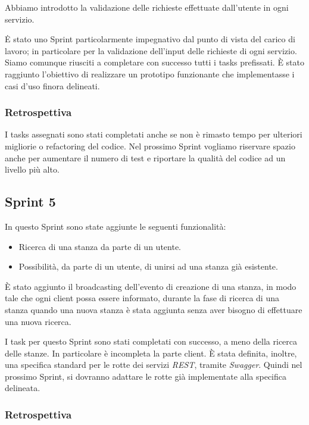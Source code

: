 Abbiamo introdotto la validazione delle richieste effettuate dall'utente in ogni servizio.

Ė stato uno Sprint particolarmente impegnativo dal punto di vista del carico di lavoro; in particolare per la validazione dell'input delle richieste di ogni servizio. Siamo comunque riusciti a completare con successo tutti i tasks prefissati.
È stato raggiunto l'obiettivo di realizzare un prototipo funzionante che implementasse i casi d'uso finora delineati.

\subsubsection{Retrospettiva}

I tasks assegnati sono stati completati anche se non è rimasto tempo per ulteriori migliorie o refactoring del codice. Nel prossimo Sprint vogliamo riservare spazio anche per aumentare il numero di test e riportare la qualità del codice ad un livello più alto.

\subsection{Sprint 5}

In questo Sprint sono state aggiunte le seguenti funzionalità:

\begin{itemize}
%
    \item Ricerca di una stanza da parte di un utente.
%
    \item Possibilità, da parte di un utente, di unirsi ad una stanza già esistente.
%
\end{itemize}

\`E stato aggiunto il broadcasting dell'evento di creazione di una stanza, in modo tale che ogni client possa essere informato, durante la fase di ricerca di una stanza quando una nuova stanza è stata aggiunta senza aver bisogno di effettuare una nuova ricerca.

I task per questo Sprint sono stati completati con successo, a meno della ricerca delle stanze. In particolare è incompleta la parte client.
\`E stata definita, inoltre, una specifica standard per le rotte dei servizi \textit{REST}, tramite \textit{Swagger}. Quindi nel prossimo Sprint, si dovranno adattare le rotte già implementate alla specifica delineata.

\subsubsection{Retrospettiva}

